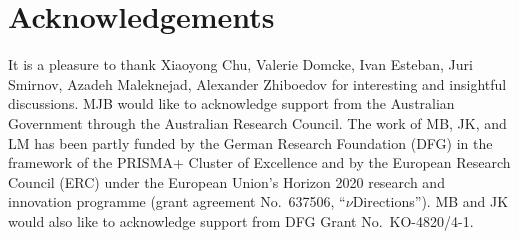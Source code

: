 \documentclass[
onecolumn, %
11pt, %
tightenlines,
superscriptaddress, %
nofootinbib, %
preprintnumbers, %
prd %
]{revtex4-1}
\begin{document}
\section*{Acknowledgements}

It is a pleasure to thank Xiaoyong Chu, Valerie Domcke, Ivan Esteban, Juri Smirnov, Azadeh Maleknejad, Alexander Zhiboedov for interesting and insightful discussions.
MJB would like to acknowledge support from the Australian Government through the Australian Research Council.
The work of MB, JK, and LM has been partly funded by the German Research Foundation (DFG) in the framework of the PRISMA+ Cluster of Excellence and by the European Research Council (ERC) under the European Union's Horizon 2020 research and innovation programme (grant agreement No.\ 637506, ``$\nu$Directions''). MB and JK would also like to acknowledge support from DFG Grant No.~KO-4820/4-1.




\end{document}
